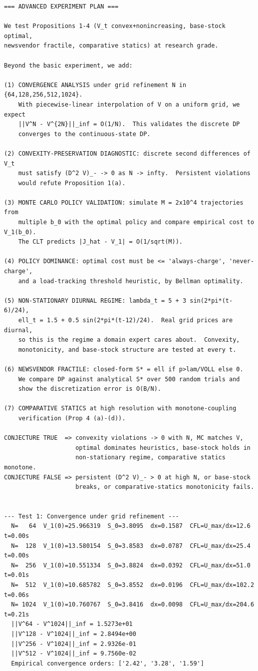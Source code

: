 \documentclass[11pt]{article}
\begin{document}
\begin{lstlisting}
=== ADVANCED EXPERIMENT PLAN ===

We test Propositions 1-4 (V_t convex+nonincreasing, base-stock optimal,
newsvendor fractile, comparative statics) at research grade.

Beyond the basic experiment, we add:

(1) CONVERGENCE ANALYSIS under grid refinement N in {64,128,256,512,1024}.
    With piecewise-linear interpolation of V on a uniform grid, we expect
    ||V^N - V^{2N}||_inf = O(1/N).  This validates the discrete DP
    converges to the continuous-state DP.

(2) CONVEXITY-PRESERVATION DIAGNOSTIC: discrete second differences of V_t
    must satisfy (D^2 V)_- -> 0 as N -> infty.  Persistent violations
    would refute Proposition 1(a).

(3) MONTE CARLO POLICY VALIDATION: simulate M = 2x10^4 trajectories from
    multiple b_0 with the optimal policy and compare empirical cost to V_1(b_0).
    The CLT predicts |J_hat - V_1| = O(1/sqrt(M)).

(4) POLICY DOMINANCE: optimal cost must be <= 'always-charge', 'never-charge',
    and a load-tracking threshold heuristic, by Bellman optimality.

(5) NON-STATIONARY DIURNAL REGIME: lambda_t = 5 + 3 sin(2*pi*(t-6)/24),
    ell_t = 1.5 + 0.5 sin(2*pi*(t-12)/24).  Real grid prices are diurnal,
    so this is the regime a domain expert cares about.  Convexity,
    monotonicity, and base-stock structure are tested at every t.

(6) NEWSVENDOR FRACTILE: closed-form S* = ell if p>lam/VOLL else 0.
    We compare DP against analytical S* over 500 random trials and
    show the discretization error is O(B/N).

(7) COMPARATIVE STATICS at high resolution with monotone-coupling
    verification (Prop 4 (a)-(d)).

CONJECTURE TRUE  => convexity violations -> 0 with N, MC matches V,
                    optimal dominates heuristics, base-stock holds in
                    non-stationary regime, comparative statics monotone.
CONJECTURE FALSE => persistent (D^2 V)_- > 0 at high N, or base-stock
                    breaks, or comparative-statics monotonicity fails.


--- Test 1: Convergence under grid refinement ---
  N=   64  V_1(0)=25.966319  S_0=3.8095  dx=0.1587  CFL=U_max/dx=12.6  t=0.00s
  N=  128  V_1(0)=13.580154  S_0=3.8583  dx=0.0787  CFL=U_max/dx=25.4  t=0.00s
  N=  256  V_1(0)=10.551334  S_0=3.8824  dx=0.0392  CFL=U_max/dx=51.0  t=0.01s
  N=  512  V_1(0)=10.685782  S_0=3.8552  dx=0.0196  CFL=U_max/dx=102.2  t=0.06s
  N= 1024  V_1(0)=10.760767  S_0=3.8416  dx=0.0098  CFL=U_max/dx=204.6  t=0.21s
  ||V^64 - V^1024||_inf = 1.5273e+01
  ||V^128 - V^1024||_inf = 2.8494e+00
  ||V^256 - V^1024||_inf = 2.9326e-01
  ||V^512 - V^1024||_inf = 9.7560e-02
  Empirical convergence orders: ['2.42', '3.28', '1.59']


\end{lstlisting}
\end{document}
